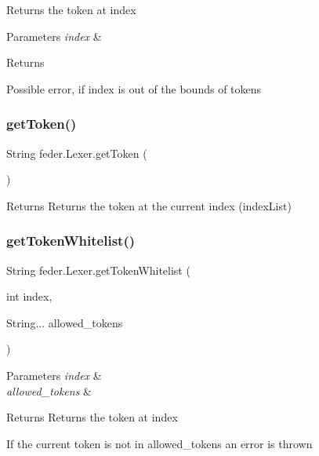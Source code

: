 Returns the token at \textquotesingle{}index\textquotesingle{} 
\begin{DoxyParams}{Parameters}
{\em index} & \\
\hline
\end{DoxyParams}
\begin{DoxyReturn}{Returns}

\end{DoxyReturn}
Possible error, if index is out of the bounds of tokens \mbox{\label{classfeder_1_1Lexer_a61a77f59e6000f6f6989d700e7902949}} 
\subsubsection{\texorpdfstring{get\+Token()}{getToken()}\hspace{0.1cm}{\footnotesize\ttfamily [2/2]}}
{\footnotesize\ttfamily String feder.\+Lexer.\+get\+Token (\begin{DoxyParamCaption}{ }\end{DoxyParamCaption})}

\begin{DoxyReturn}{Returns}
Returns the token at the current index (index\+List) 
\end{DoxyReturn}
\mbox{\label{classfeder_1_1Lexer_aeb51675939cd32f0c6c7b896060b1379}} 
\subsubsection{\texorpdfstring{get\+Token\+Whitelist()}{getTokenWhitelist()}\hspace{0.1cm}{\footnotesize\ttfamily [1/2]}}
{\footnotesize\ttfamily String feder.\+Lexer.\+get\+Token\+Whitelist (\begin{DoxyParamCaption}\item[{int}]{index,  }\item[{String...}]{allowed\+\_\+tokens }\end{DoxyParamCaption})}


\begin{DoxyParams}{Parameters}
{\em index} & \\
\hline
{\em allowed\+\_\+tokens} & \\
\hline
\end{DoxyParams}
\begin{DoxyReturn}{Returns}
Returns the token at index
\end{DoxyReturn}
If the current token is not in allowed\+\_\+tokens an error is thrown \mbox{\label{classfeder_1_1Lexer_afc4f6ea269fbaf8b8a48d97d73972c2d}} 
